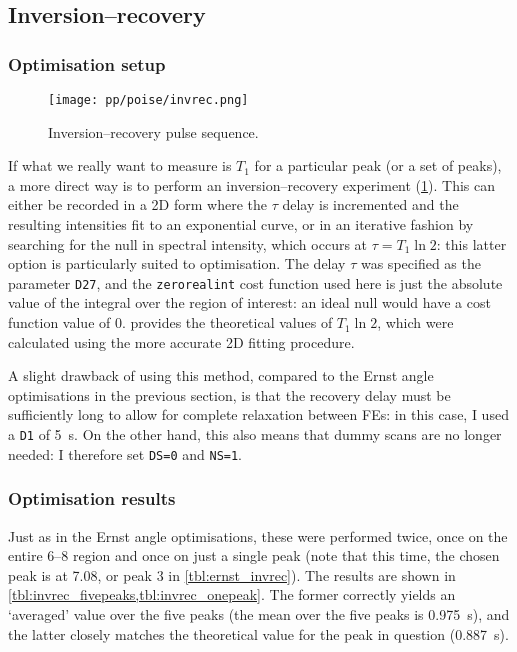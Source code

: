 \subsection{Inversion--recovery}
\label{subsec:poise__invrec}


\subsubsection{Optimisation setup}

\begin{figure}[htb]
    \centering
    \texttt{[image: pp/poise/invrec.png]}%
    \caption[Inversion--recovery pulse sequence]{Inversion--recovery pulse sequence.}
    \label{fig:poise_invrec}
\end{figure}

If what we really want to measure is $T_1$ for a particular peak (or a set of peaks), a more direct way is to perform an inversion--recovery experiment (\cref{fig:poise_invrec}).
This can either be recorded in a 2D form where the $\tau$ delay is incremented and the resulting intensities fit to an exponential curve, or in an iterative fashion by searching for the null in spectral intensity, which occurs at $\tau = T_1\ln 2$: this latter option is particularly suited to optimisation.
The delay $\tau$ was specified as the parameter \texttt{D27}, and the \texttt{zerorealint} cost function used here is just the absolute value of the integral over the region of interest: an ideal null would have a cost function value of 0.
 provides the theoretical values of $T_1 \ln 2$, which were calculated using the more accurate 2D fitting procedure.

A slight drawback of using this method, compared to the Ernst angle optimisations in the previous section, is that the recovery delay must be sufficiently long to allow for complete relaxation between FEs: in this case, I used a \texttt{D1} of \qty{5}{\s}.
On the other hand, this also means that dummy scans are no longer needed: I therefore set \texttt{DS=0} and \texttt{NS=1}.


\subsubsection{Optimisation results}

Just as in the Ernst angle optimisations, these were performed twice, once on the entire 6--\qty{8}{\ppm} region and once on just a single peak (note that this time, the chosen peak is at \qty{7.08}{\ppm}, or peak 3 in \cref{tbl:ernst_invrec}).
The results are shown in \cref{tbl:invrec_fivepeaks,tbl:invrec_onepeak}.
The former correctly yields an `averaged' value over the five peaks (the mean over the five peaks is \qty{0.975}{\s}), and the latter closely matches the theoretical value for the peak in question (\qty{0.887}{\s}).

